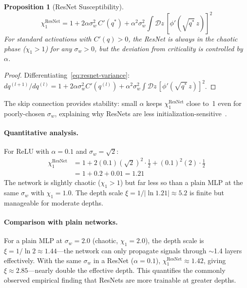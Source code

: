 \documentclass[10pt]{article}
\newtheorem{proposition}[theorem]{Proposition}
\begin{document}
\begin{proposition}[ResNet Susceptibility]
\label{prop:resnet-chi1}
\begin{equation}
    \chi_1^{\text{ResNet}} = 1 + 2\alpha\sigma_w^2\, C'(q^*) + \alpha^2 \sigma_w^2 \int \mathcal{D}z\, [\phi'(\sqrt{q^*}\, z)]^2
\end{equation}
For standard activations with $C'(q) > 0$, the ResNet is always in the chaotic phase ($\chi_1 > 1$) for any $\sigma_w > 0$, but the deviation from criticality is controlled by $\alpha$.
\end{proposition}

\begin{proof}
Differentiating~\eqref{eq:resnet-variance}:
$dq^{(l+1)}/dq^{(l)} = 1 + 2\alpha\sigma_w^2 C'(q^{(l)}) + \alpha^2 \sigma_w^2 \int \mathcal{D}z\, [\phi'(\sqrt{q^*}\, z)]^2$.
\end{proof}

The skip connection provides stability: small $\alpha$ keeps $\chi_1^{\text{ResNet}}$ close to~1 even for poorly-chosen $\sigma_w$, explaining why ResNets are less initialization-sensitive~\cite{yang2017mean}.

\paragraph{Quantitative analysis.}
For ReLU with $\alpha = 0.1$ and $\sigma_w = \sqrt{2}$:
\begin{align}
    \chi_1^{\text{ResNet}} &= 1 + 2(0.1)(\sqrt{2})^2 \cdot \frac{1}{2} + (0.1)^2 (2) \cdot \frac{1}{2} \\
    &= 1 + 0.2 + 0.01 = 1.21
\end{align}
The network is slightly chaotic ($\chi_1 > 1$) but far less so than a plain MLP at the same $\sigma_w$ with $\chi_1 = 1.0$.
The depth scale $\xi = 1/|\ln 1.21| \approx 5.2$ is finite but manageable for moderate depths.

\paragraph{Comparison with plain networks.}
For a plain MLP at $\sigma_w = 2.0$ (chaotic, $\chi_1 = 2.0$), the depth scale is $\xi = 1/\ln 2 \approx 1.44$---the network can only propagate signals through $\sim$1.4 layers effectively.
With the same $\sigma_w$ in a ResNet ($\alpha = 0.1$), $\chi_1^{\text{ResNet}} \approx 1.42$, giving $\xi \approx 2.85$---nearly double the effective depth.
This quantifies the commonly observed empirical finding that ResNets are more trainable at greater depths.
\end{document}
